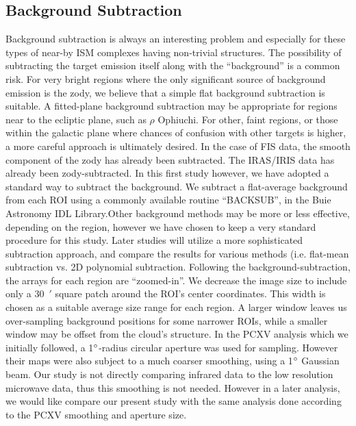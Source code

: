 \subsection{Background Subtraction}
     Background subtraction is always an interesting problem and especially for these types of near-by ISM complexes having non-trivial structures. The possibility of subtracting the target emission itself along with the ``background” is a common risk. For very bright regions where the only significant source of background emission is the zody, we believe that a simple flat background subtraction is suitable. A fitted-plane background subtraction may be appropriate for regions near to the ecliptic plane, such as $\rho$ Ophiuchi. For other, faint regions, or those within the galactic plane where chances of confusion with other targets is higher, a more careful approach is ultimately desired. In the case of FIS data, the smooth component of the zody has already been subtracted. The IRAS/IRIS data has already been zody-subtracted. 
     In this first study however, we have adopted a standard way to subtract the background. We subtract a flat-average background from each ROI using a commonly available routine ``BACKSUB”, in the Buie Astronomy IDL Library.Other background methods may be more or less effective, depending on the region, however we have chosen to keep a very standard procedure for this study. Later studies will utilize a more sophisticated subtraction approach, and compare the results for various methods (i.e. flat-mean subtraction vs. 2D polynomial subtraction.
     Following the background-subtraction, the arrays for each region are ``zoomed-in”. We decrease the image size to include only a 30~$'$ square patch around the ROI’s center coordinates. This width is chosen as a suitable average size range for each region. A larger window leaves us over-sampling background positions for some narrower ROIs, while a smaller window may be offset from the cloud’s structure. In the PCXV analysis which we initially followed, a 1$\degree$-radius circular aperture was used for sampling. However their maps were also subject to a much coarser smoothing, using a 1$\degree$ Gaussian beam. Our study is not directly comparing infrared data to the low resolution microwave data, thus this smoothing is not needed. However in a later analysis, we would like compare our present study with the same analysis done according to the PCXV smoothing and aperture size.
